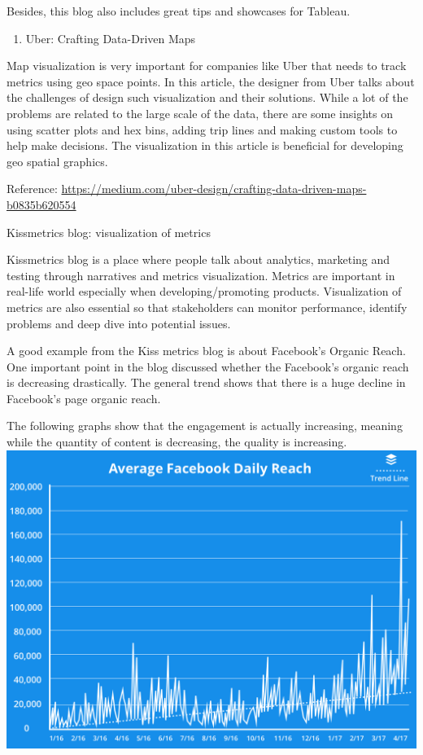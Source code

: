 \documentclass[]{book}
\providecommand{\tightlist}{%
  \setlength{\itemsep}{0pt}\setlength{\parskip}{0pt}}
\theoremstyle{definition}
\theoremstyle{definition}
\theoremstyle{definition}
\theoremstyle{remark}
\begin{document}
Besides, this blog also includes great tips and showcases for Tableau.

\begin{enumerate}
\def\labelenumi{\arabic{enumi}.}
\setcounter{enumi}{6}
\tightlist
\item
  Uber: Crafting Data-Driven Maps
\end{enumerate}

Map visualization is very important for companies like Uber that needs
to track metrics using geo space points. In this article, the designer
from Uber talks about the challenges of design such visualization and
their solutions. While a lot of the problems are related to the large
scale of the data, there are some insights on using scatter plots and
hex bins, adding trip lines and making custom tools to help make
decisions. The visualization in this article is beneficial for
developing geo spatial graphics.

Reference:
\url{https://medium.com/uber-design/crafting-data-driven-maps-b0835b620554}

Kissmetrics blog: visualization of metrics

Kissmetrics blog is a place where people talk about analytics, marketing
and testing through narratives and metrics visualization. Metrics are
important in real-life world especially when developing/promoting
products. Visualization of metrics are also essential so that
stakeholders can monitor performance, identify problems and deep dive
into potential issues.

A good example from the Kiss metrics blog is about Facebook's Organic
Reach. One important point in the blog discussed whether the Facebook's
organic reach is decreasing drastically. The general trend shows that
there is a huge decline in Facebook's page organic reach.

The following graphs show that the engagement is actually increasing,
meaning while the quantity of content is decreasing, the quality is
increasing. \includegraphics{images/average-facebook-reach.png}
\end{document}
